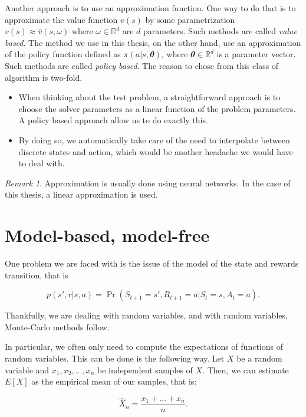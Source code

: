 \documentclass[
  letterpaper,
]{report}
\theoremstyle{definition}
\theoremstyle{plain}
\theoremstyle{definition}
\theoremstyle{remark}
\newtheorem*{remark}{Remark}
\begin{document}
Another approach is to use an approximation function. One way to do that
is to approximate the value function \(v(s)\) by some parametrization
\(v(s) \approx \hat{v}(s,\omega)\) where \(\omega \in \mathbb{R}^d\) are
\(d\) parameters. Such methods are called \emph{value based}. The method
we use in this thesis, on the other hand, use an approximation of the
policy function defined as \(\pi(a|s,\mathbfit{\theta})\), where
\(\mathbfit{\theta}\in \mathbb{R}^d\) is a parameter vector. Such
methods are called \emph{policy based}. The reason to chose from this
class of algorithm is two-fold.

\begin{itemize}
\item
  When thinking about the test problem, a straightforward approach is to
  choose the solver parameters as a linear function of the problem
  parameters. A policy based approach allow us to do exactly this.
\item
  By doing so, we automatically take care of the need to interpolate
  between discrete states and action, which would be another headache we
  would have to deal with.
\end{itemize}

\begin{remark}
Approximation is usually done using neural networks. In the case of this
thesis, a linear approximation is used.
\end{remark}

\section{Model-based, model-free}\label{model-based-model-free}

One problem we are faced with is the issue of the model of the state and
rewards transition, that is

\[
p(s',r|s,a) = \Pr(S_{t+1} = s', R_{t+1} = a | S_t = s, A_t = a).
\]

Thankfully, we are dealing with random variables, and with random
variables, Monte-Carlo methods follow.

In particular, we often only need to compute the expectations of
functions of random variables. This can be done is the following way.
Let \(X\) be a random variable and \(x_1, x_2, \dots , x_n\) be
independent samples of \(X\). Then, we can estimate \(E[X]\) as the
empirical mean of our samples, that is:

\[
\hat{X}_n = \frac{x_1 + \dots + x_n}{n}.
\]
\end{document}
